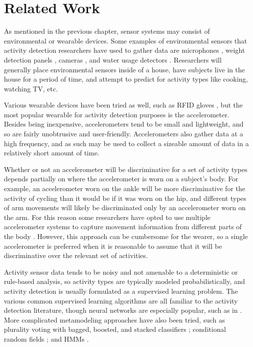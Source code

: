 \chapter{Related Work}
As mentioned in the previous chapter, sensor systems may consist
of environmental or wearable devices. Some examples of environmental
sensors that activity detection researchers have used to
gather data are microphones \cite{fogarty06}, weight detection
panels \cite{rowan05}, cameras \cite{duong05}, and water usage detectors
\cite{fogarty06}. Researchers will generally place environmental sensors
inside of a house, have subjects live in the house for a period of time, and
attempt to predict for activity types like cooking, watching TV, etc.

Various wearable devices have been tried as well, such as RFID gloves
\cite{rowan05}, but the most popular wearable for activity detection
purposes is the accelerometer. Besides being inexpensive, accelerometers
tend to be small and lightweight, and so are fairly unobtrusive and
user-friendly. Accelerometers also gather data at a high frequency, and as such
may be used to collect a sizeable amount of data in a relatively short amount
of time.

Whether or not an accelerometer will be discriminative for a
set of activity types depends partially on where the accelerometer is worn on
a subject's body. For example, an accelerometer worn on the ankle will be
more discriminative for the activity of cycling than it would be if it was worn
on the hip, and different types of arm movements will likely be
discriminated only by an accelerometer worn on the arm. For this reason some
researchers have opted to use multiple accelerometer systems to capture
movement information from different parts of the body \cite{bao04}
\cite{devries11}. However, this approach can be cumbersome for the wearer, so a
single accelerometer is preferred when it is reasonable to assume that it will
be discriminative over the relevant set of activities.

Activity sensor data tends to be noisy and not amenable to a
deterministic or rule-based analysis, so activity types are typically modeled
probabilistically, and activity detection is usually formulated as a supervised
learning problem. The various common supervised learning algorithms are all
familiar to the activity detection literature, though neural networks are
especially popular, such as in \cite{aminian95} \cite{song07} \cite{staudenmeyer09}.
More complicated metamodeling approaches have also been tried, such as
plurality voting with bagged, boosted, and stacked classifiers \cite{ravi05};
conditional random fields \cite{vankasteren08}; and HMMs
\cite{lester05} \cite{pober06}.
